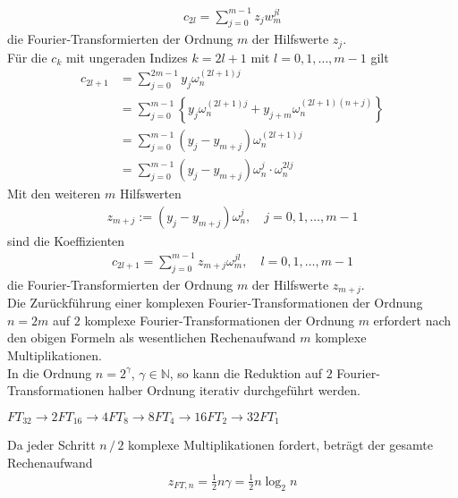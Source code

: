 \begin{align*}
  c_{2l} = \sum_{j=0}^{m-1} z_jw_m^{jl}
\end{align*}
die Fourier-Transformierten der Ordnung $m$ der Hilfswerte $z_j$. \\
Für die $c_k$ mit ungeraden Indizes $k=2l+1$ mit $l=0,1,\dots,m-1$ gilt 
\begin{align*}
  c_{2l+1} &= \sum_{j=0}^{2m-1} y_j\omega_n^{(2l+1)j} \\
  &= \sum_{j=0}^{m-1}\left\{ y_j\omega_n^{(2l+1)j}+y_{j+m}\omega_n^{(2l+1)(n+j)}\right\}\\
  &= \sum_{j=0}^{m-1}(y_j-y_{m+j})\omega_n^{(2l+1)j} \\
  &= \sum_{j=0}^{m-1}(y_j-y_{m+j})\omega_n^{j}\cdot\omega_n^{2lj}
\end{align*}
Mit den weiteren $m$ Hilfswerten
\begin{align*}
  z_{m+j} := (y_j-y_{m+j})\omega_n^j,\quad j=0,1,\dots,m-1
\end{align*}
sind die Koeffizienten
\begin{align*}
  c_{2l+1} = \sum_{j=0}^{m-1} z_{m+j} \omega_m^{jl}, \quad l=0,1,\dots,m-1
\end{align*}
die Fourier-Transformierten der Ordnung $m$ der Hilfswerte $z_{m+j}$. \\
Die Zurückführung einer komplexen Fourier-Transformationen der Ordnung $n=2m$ auf $2$ komplexe Fourier-Transformationen 
der Ordnung $m$ erfordert nach den obigen Formeln als wesentlichen Rechenaufwand $m$ komplexe Multiplikationen. \\
In die Ordnung $n=2^\gamma$, $\gamma\in\mathbb{N}$, so kann die Reduktion auf $2$ Fourier-Transformationen halber Ordnung
iterativ durchgeführt werden. \\
\begin{egbox}
  $FT_{32} \to 2FT_{16}\to 4FT_8 \to 8FT_4 \to 16FT_2\to 32FT_1$
\end{egbox}
Da jeder Schritt $n\,/\,2$ komplexe Multiplikationen fordert, beträgt der gesamte Rechenaufwand
\begin{align*}
  z_{FT,n} = \tfrac{1}{2}n\gamma = \tfrac{1}{2}n\log_2 n
\end{align*}
